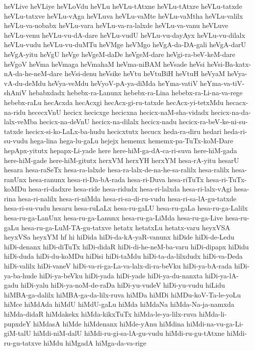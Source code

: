 {heVLive
heVLiye
heVLoVdu
heVLu
heVLu-tAtxne
heVLu-tAtxre
heVLu-tatxde
heVLu-tatxve
heVLu-vAga
heVLuva
heVLu-vaMte
heVLu-vaMtha
heVLu-valilx
heVLu-va-nobabx
heVLu-vara
heVLu-va-ra-lalxde
heVLu-va-vanu
heVLuve
heVLu-venu
heVLu-vu-dA-dare
heVLu-vudU
heVLu-vu-dayAyx
heVLu-vu-dilalx
heVLu-vudu
heVLu-vu-duMTu
heVMge
heVMgo
heVgA-da-DA-gali
heVgA-darU
heVgA-yitu
heVgU
heVge
heVgeM-daDe
heVgeM-dare
heVgi-ra-beV-keM-dare
heVgoV
heVma
heVmaga
heVmahaM
heVma-niBAM
heVsade
heVsi
heVsi-Ba-katx-nA-da-he-neM-dare
heVsi-denu
heVsike
heVtu
heVtuBiH
heVtuH
heVyaM
heVya-vA-du-deMdu
heVya-veMdu
heVyoV-pA-ya-diMda
heYma-vatiV
heYma-va-tiV-shAniV
hebabxdadx
hebebx-ra-Lanunx
hebebx-ra-Lina
hebebx-ra-Li-na-va-rege
hebebx-raLu
hecAcxda
hecAcxgi
hecAcx-gi-ru-tatxde
hecAcx-yi-tetxMdu
hecacx-na-ridu
hececxVnU
hecicx
hecicxge
hecicxna
hecicx-naM-sha-vidadx
hecicx-na-da-lalx-veMba
hecicx-na-deVnU
hecicx-na-dilalx
hecicx-nadu
hecicx-ra-beV-ke-ni-su-tatxde
hecicx-si-ko-LaLx-ba-hudu
hecicxtutx
hecucx
heda-ra-diru
hedari
heda-ri-su-vudu
hega-lina
hega-lu-gaLu
hejejx
hememx
hememx-pa-TuTx-koM-Dare
hepApx-yitutx
hepapx-Li-yade
here
here-hiM-ga-dA-ca-ri-suva
here-hiM-gada
here-hiM-gade
here-hiM-gitutx
herxVM
herxYH
herxYM
hesa-rA-yitu
hesarU
hesara
hesa-raSeTx
hesa-ra-lalxde
hesa-ra-lalx-de-na-he-sa-ralilx
hesa-ralilx
hesa-ranUnx
hesa-ranunx
hesa-ri-Da-bA-rada
hesa-ri-Duva
hesa-riTuTx
hesa-ri-TuTx-koMDu
hesa-ri-dadxre
hesa-ride
hesa-ridudx
hesa-ri-lalxda
hesa-ri-lalx-vAgi
hesa-rina
hesa-ri-nalilx
hesa-ri-niMda
hesa-ri-sa-di-ru-vudu
hesa-ri-sa-lA-gu-tatxde
hesa-ri-su-vudu
hesaru
hesa-ruLaLx
hesa-ru-gaLU
hesa-ru-gaLa
hesa-ru-ga-Lalilx
hesa-ru-ga-LanUnx
hesa-ru-ga-Lanunx
hesa-ru-ga-LiMda
hesa-ru-ga-Live
hesa-ru-gaLu
hesa-ru-ga-LuM-TA-gu-tatxve
hetatx
hetatxLu
hetatx-varu
heyxVSA
heyxVSa
heyxYM
hf
hi
hiDida
hiDi-da-kA-yaR-vanunx
hiDide
hiDi-de-Ledu
hiDi-denanx
hiDi-diTuTx
hiDi-didaR
hiDi-di-he-neM-ba-varu
hiDi-dipapx
hiDidu
hiDi-duda
hiDi-du-koMDu
hiDisi
hiDi-taMdu
hiDi-ta-da-lilxdudx
hiDi-va-Deda
hiDi-valilx
hiDi-vaneV
hiDi-va-ri-ga-La-va-lalx-di-ra-beVku
hiDi-ya-bA-rada
hiDi-ya-ba-hude
hiDi-ya-beVku
hiDi-yada
hiDi-yade
hiDi-ya-du-nanxta
hiDi-ya-lA-gadu
hiDi-yalu
hiDi-ya-noM-de-raDa
hiDi-yu-vudeV
hiDi-yu-vudu
hiLidu
hiMBA-ga-dalilx
hiMBA-ga-da-lilx-ruva
hiMDa
hiMDi
hiMDu-koV-Ta-le-yoLu
hiMce
hiMdAda
hiMdU
hiMdU-gaLu
hiMda
hiMdaNa
hiMda-Na-ja-namxda
hiMda-didaR
hiMdakekx
hiMda-kikxTuTx
hiMda-le-ya-lilx-ruva
hiMda-li-pupxdeY
hiMdasA
hiMde
hiMdenanx
hiMde-yAnu
hiMdina
hiMdi-na-vu-ga-Li-giM-talU
hiMdi-niM-dalU
hiMdi-ru-gi-sa-lA-gu-vudu
hiMdi-ru-gu-tAtxne
hiMdi-ru-gu-tatxve
hiMdu
hiMgadA
hiMga-da-va-rige
}
